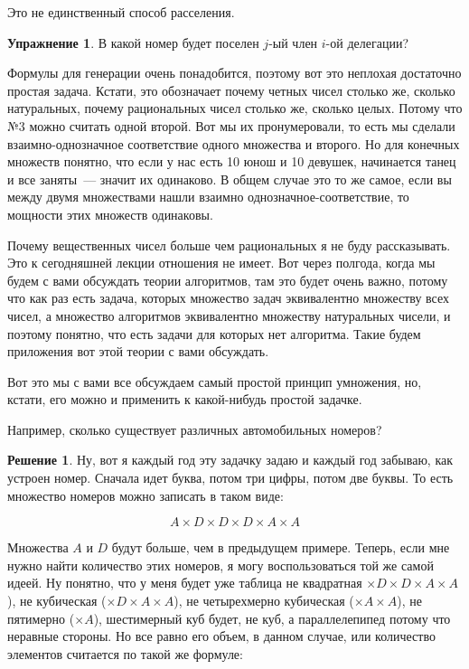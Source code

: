 \documentclass[russian]{lecture-notes}
\theoremstyle{definition}
\newtheorem*{exercise}{Упражнение}
\newtheorem*{solution}{Решение}
\begin{document}
\begin{enumerate}
		\noindent Это не единственный способ расселения.
		
		
		\begin{exercise}
			В какой номер будет поселен $j$-ый член $i$-ой делегации?
		\end{exercise}
	
		Формулы для генерации очень понадобится, поэтому вот это неплохая достаточно простая задача. Кстати, это обозначает почему четных чисел столько же, сколько натуральных, почему рациональных чисел столько же, сколько целых. Потому что №3 можно считать одной второй. Вот мы их пронумеровали, то есть мы сделали взаимно-однозначное соответствие одного множества и второго. Но для конечных множеств понятно, что если у нас есть 10 юнош и 10 девушек, начинается танец и все заняты~--- значит их одинаково. В общем случае это то же самое, если вы между двумя множествами нашли взаимно однозначное-соответствие, то мощности этих множеств одинаковы.
		
		Почему вещественных чисел больше чем рациональных я не буду рассказывать. Это к сегодняшней лекции отношения не имеет. Вот через полгода, когда мы будем с вами обсуждать теории алгоритмов, там это будет очень важно, потому что как раз есть задача, которых множество задач эквивалентно множеству всех чисел, а множество алгоритмов эквивалентно множеству натуральных чисели, и поэтому понятно, что есть задачи для которых нет алгоритма. Такие будем приложения вот этой теории с вами обсуждать.
		
		Вот это мы с вами все обсуждаем самый простой принцип умножения, но, кстати, его можно и применить к какой-нибудь простой задачке. 
		
		
		\begin{problem}
			Например, сколько существует различных автомобильных номеров? 
		\end{problem}
	
		\begin{solution}
			Ну, вот я каждый год эту задачку задаю и каждый год забываю, как устроен номер. Сначала идет буква, потом три цифры, потом две буквы. То есть множество номеров можно записать в таком виде:
			
			\[
			A \times D \times D \times D \times A \times A
			\]
			
			Множества $A$ и $D$ будут больше, чем в предыдущем примере. Теперь, если мне нужно найти количество этих номеров, я могу воспользоваться той же самой идеей. Ну понятно, что у меня будет уже таблица не квадратная $\times D \times D \times A \times A$), не кубическая ($\times D \times A \times A$), не четырехмерно кубическая ($\times A \times A$), не пятимерно ($\times A$), шестимерный куб будет, не куб, а параллелепипед потому что неравные стороны. Но все равно его объем, в данном случае, или количество элементов считается по такой же формуле:
			

\end{solution}
\end{enumerate}
\end{document}
